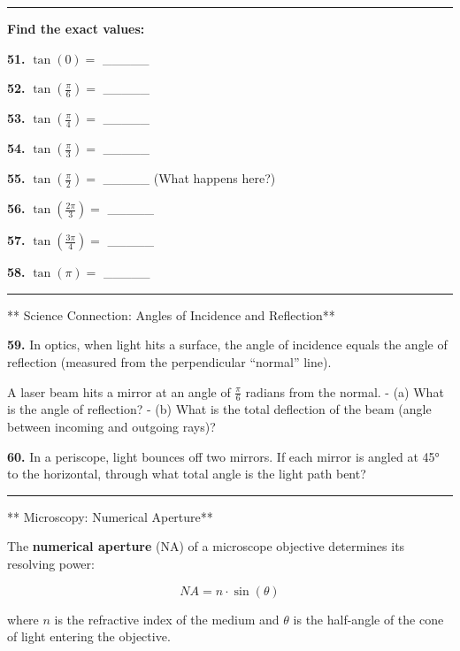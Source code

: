 \documentclass[
  11pt,
]{article}
\begin{document}
\begin{center}\rule{0.5\linewidth}{0.5pt}\end{center}

\textbf{Find the exact values:}

\textbf{51.} \(\tan(0) ={}\) \_\_\_\_\_

\textbf{52.} \(\tan\left(\frac{\pi}{6}\right) ={}\) \_\_\_\_\_

\textbf{53.} \(\tan\left(\frac{\pi}{4}\right) ={}\) \_\_\_\_\_

\textbf{54.} \(\tan\left(\frac{\pi}{3}\right) ={}\) \_\_\_\_\_

\textbf{55.} \(\tan\left(\frac{\pi}{2}\right) ={}\) \_\_\_\_\_ (What
happens here?)

\textbf{56.} \(\tan\left(\frac{2\pi}{3}\right) ={}\) \_\_\_\_\_

\textbf{57.} \(\tan\left(\frac{3\pi}{4}\right) ={}\) \_\_\_\_\_

\textbf{58.} \(\tan(\pi) ={}\) \_\_\_\_\_

\begin{center}\rule{0.5\linewidth}{0.5pt}\end{center}

** Science Connection: Angles of Incidence and Reflection**

\textbf{59.} In optics, when light hits a surface, the angle of
incidence equals the angle of reflection (measured from the
perpendicular ``normal'' line).

A laser beam hits a mirror at an angle of \(\frac{\pi}{6}\) radians from
the normal. - (a) What is the angle of reflection? - (b) What is the
total deflection of the beam (angle between incoming and outgoing rays)?

\textbf{60.} In a periscope, light bounces off two mirrors. If each
mirror is angled at 45° to the horizontal, through what total angle is
the light path bent?

\begin{center}\rule{0.5\linewidth}{0.5pt}\end{center}

** Microscopy: Numerical Aperture**

The \textbf{numerical aperture} (NA) of a microscope objective
determines its resolving power:

\[NA = n \cdot \sin(\theta)\]

where \(n\) is the refractive index of the medium and \(\theta\) is the
half-angle of the cone of light entering the objective.
\end{document}
